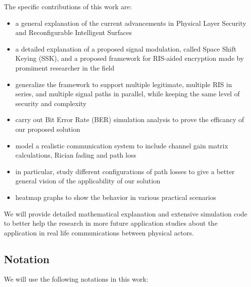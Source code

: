The specific contributions of this work are:
\begin{itemize}
  \item a general explanation of the current advancements in Physical Layer Security and Reconfigurable Intelligent Surfaces
  \item a detailed explanation of a proposed signal modulation, called Space Shift Keying (SSK), and a proposed framework for RIS-aided encryption made by promiment researcher in the field
  \item generalize the framework to support multiple legitimate, multiple RIS in series, and multiple signal paths in parallel, while keeping the same level of security and complexity
  \item carry out Bit Error Rate (BER) simulation analysis to prove the efficancy of our proposed solution
  \item model a realistic communication system to include channel gain matrix calculations, Rician fading and path loss
  \item in particular, study different configurations of path losses to give a better general vision of the applicability of our solution
  \item heatmap graphs to show the behavior in various practical scenarios
\end{itemize}

We will provide detailed mathematical explanation and extensive simulation code to better help the research in more future application studies about the application in real life communications between physical actors.

\subsection{Notation}

We will use the following notations in this work:


